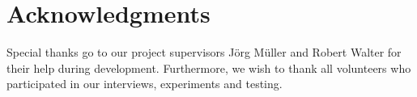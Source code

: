 \documentclass{chi-ext}
\begin{document}
\section{Acknowledgments}
Special thanks go to our project supervisors J\"org M\"uller and Robert Walter for their help during development. Furthermore, we wish to thank all volunteers who participated in our interviews, experiments and testing.
%
%
\end{document}
